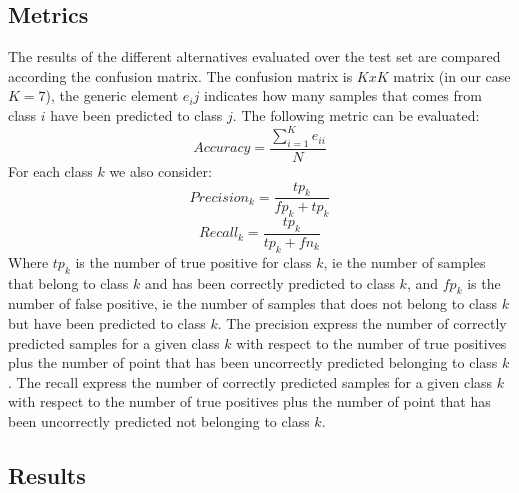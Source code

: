 \documentclass[a4paper,10pt]{article}
\begin{document}
  \subsection{Metrics}
    The results of the different alternatives evaluated over the test set are compared according the confusion matrix.\newline
    The confusion matrix is $K x K$ matrix (in our case $K = 7$), the generic element $e_ij$ indicates how many samples 
    that comes from class $i$ have been predicted to class $j$.\newline
    The following metric can be evaluated:
    \begin{equation*}
     Accuracy = \frac{\sum_{i = 1}^K e_{ii}}{N} 
    \end{equation*}
    For each class $k$ we also consider:
    \begin{equation*}
     Precision_k = \frac{tp_k}{fp_k + tp_k} 
    \end{equation*}
    \begin{equation*}
     Recall_k = \frac{tp_k}{tp_k + fn_k} 
    \end{equation*}
    Where $tp_k$ is the number of true positive for class $k$, ie the number of samples that belong to class $k$ and has been
    correctly predicted to class $k$, and $fp_k$ is the number of false positive, ie the number of samples that does not belong
    to class $k$ but have been predicted to class $k$.\newline
    The precision express the number of correctly predicted samples for a given class $k$ with respect to the number of true positives plus
    the number of point that has been uncorrectly predicted belonging to class $k$.\newline
    The recall express the number of correctly predicted samples for a given class $k$ with respect to the number of true positives plus 
    the number of point that has been uncorrectly predicted not belonging to class $k$.
  \subsection{Results}
\end{document}
